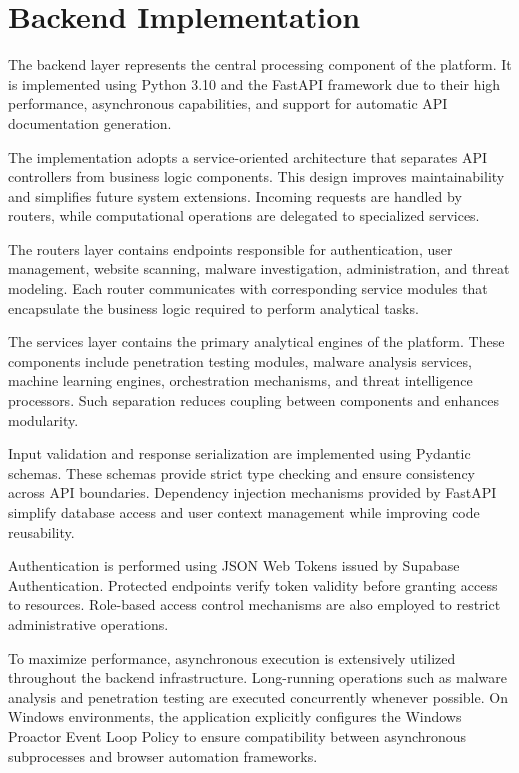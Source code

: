 \section{Backend Implementation}
The backend layer represents the central processing component of the platform. It is implemented using Python 3.10 and the FastAPI framework due to their high performance, asynchronous capabilities, and support for automatic API documentation generation.

The implementation adopts a service-oriented architecture that separates API controllers from business logic components. This design improves maintainability and simplifies future system extensions. Incoming requests are handled by routers, while computational operations are delegated to specialized services.

The routers layer contains endpoints responsible for authentication, user management, website scanning, malware investigation, administration, and threat modeling. Each router communicates with corresponding service modules that encapsulate the business logic required to perform analytical tasks.

The services layer contains the primary analytical engines of the platform. These components include penetration testing modules, malware analysis services, machine learning engines, orchestration mechanisms, and threat intelligence processors. Such separation reduces coupling between components and enhances modularity.

Input validation and response serialization are implemented using Pydantic schemas. These schemas provide strict type checking and ensure consistency across API boundaries. Dependency injection mechanisms provided by FastAPI simplify database access and user context management while improving code reusability.

Authentication is performed using JSON Web Tokens issued by Supabase Authentication. Protected endpoints verify token validity before granting access to resources. Role-based access control mechanisms are also employed to restrict administrative operations.

To maximize performance, asynchronous execution is extensively utilized throughout the backend infrastructure. Long-running operations such as malware analysis and penetration testing are executed concurrently whenever possible. On Windows environments, the application explicitly configures the Windows Proactor Event Loop Policy to ensure compatibility between asynchronous subprocesses and browser automation frameworks.

